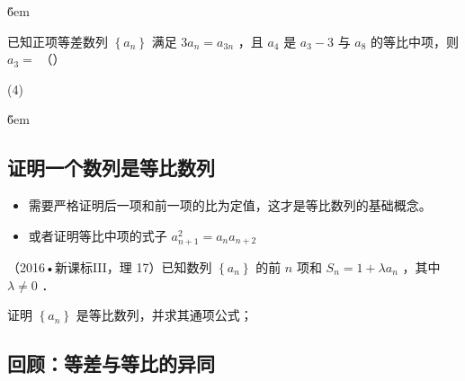\v{6em}

\begin{example}
    已知正项等差数列 $\left\{a_n\right\}$ 满足 $3 a_n=a_{3 n}$ ，且 $a_4$ 是 $a_3-3$ 与 $a_8$ 的等比中项，则 $a_3=$ （\qquad）
    \begin{tasks}(4)
    \end{tasks}
\end{example}

\v{6em}

\subsection{证明一个数列是等比数列}

\begin{theorem}
    \begin{itemize}
        \item 需要严格证明后一项和前一项的比为定值，这才是等比数列的基础概念。
        \item 或者证明等比中项的式子 $a_{n+1}^2 = a_n a_{n+2}$
    \end{itemize}
\end{theorem}

\begin{example}
    （2016•新课标III，理 17）已知数列 $\left\{a_n\right\}$ 的前 $n$ 项和 $S_n=1+\lambda a_n$ ，其中 $\lambda \neq 0$ ．

    证明 $\left\{a_n\right\}$ 是等比数列，并求其通项公式；
\end{example}

\vspace{10em}

\subsection{回顾：等差与等比的异同}

